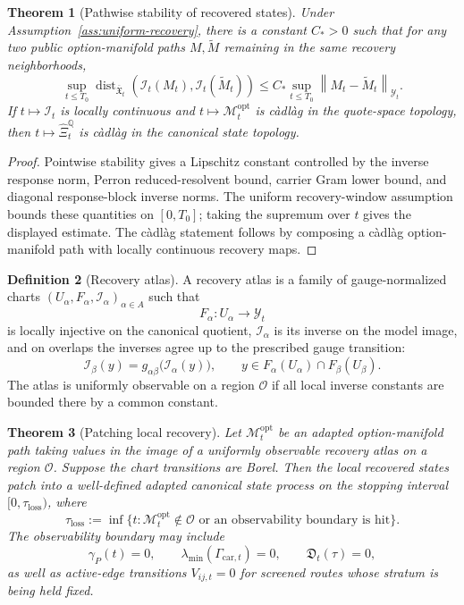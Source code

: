 \documentclass[11pt,a4paper]{amsart}
\theoremstyle{plain}
\newtheorem{theorem}{Theorem}[section]
\theoremstyle{definition}
\newtheorem{definition}[theorem]{Definition}
\theoremstyle{remark}
\DeclareMathOperator{\dist}{dist}
\newcommand{\QQ}{\mathbb{Q}}
\newcommand{\cM}{\mathcal{M}}
\newcommand{\cO}{\mathcal{O}}
\newcommand{\cY}{\mathcal{Y}}
\newcommand{\norm}[1]{\left\lVert #1\right\rVert}
\begin{document}
\begin{theorem}[Pathwise stability of recovered states]\label{thm:pathwise-stability}
Under Assumption~\ref{ass:uniform-recovery}, there is a constant \(C_*>0\) such that for any two
public option-manifold paths \(M,\widetilde M\) remaining in the same recovery neighborhoods,
\[
        \sup_{t\le T_0}
        \dist_{\overline{\mathfrak X}_t}
        \!\left(\mathcal I_t(M_t),\mathcal I_t(\widetilde M_t)\right)
        \le
        C_*
        \sup_{t\le T_0}\norm{M_t-\widetilde M_t}_{\cY_t}.
\]
If \(t\mapsto\mathcal I_t\) is locally continuous and \(t\mapsto\cM_t^{\mathrm{opt}}\) is
c\`adl\`ag in the quote-space topology, then \(t\mapsto\widehat\Xi_t^\QQ\) is c\`adl\`ag in
the canonical state topology.
\end{theorem}

\begin{proof}
Pointwise stability gives a Lipschitz constant controlled by the inverse response
norm, Perron reduced-resolvent bound, carrier Gram lower bound, and diagonal response-block inverse
norms.  The uniform recovery-window assumption bounds these quantities on \([0,T_0]\); taking the
supremum over \(t\) gives the displayed estimate.  The c\`adl\`ag statement follows by composing a
c\`adl\`ag option-manifold path with locally continuous recovery maps.
\end{proof}

\begin{definition}[Recovery atlas]\label{def:recovery-atlas}
A recovery atlas is a family of gauge-normalized charts
\((U_\alpha,F_\alpha,\mathcal I_\alpha)_{\alpha\in A}\) such that
\[
        F_\alpha:U_\alpha\to\cY_t
\]
is locally injective on the canonical quotient, \(\mathcal I_\alpha\) is its inverse on the
model image, and on overlaps the inverses agree up to the prescribed gauge transition:
\[
        \mathcal I_\beta(y)
        =
        g_{\alpha\beta}\bigl(\mathcal I_\alpha(y)\bigr),
        \qquad
        y\in F_\alpha(U_\alpha)\cap F_\beta(U_\beta).
\]
The atlas is uniformly observable on a region \(\cO\) if all local inverse constants are bounded
there by a common constant.
\end{definition}

\begin{theorem}[Patching local recovery]\label{thm:patching-local-recovery}
Let \(\cM_t^{\mathrm{opt}}\) be an adapted option-manifold path taking values in the image of a
uniformly observable recovery atlas on a region \(\cO\).  Suppose the chart transitions are
Borel.  Then the local recovered states patch into a well-defined adapted canonical state
process on the stopping interval \([0,\tau_{\mathrm{loss}})\), where
\[
        \tau_{\mathrm{loss}}
        :=
        \inf\{t:\cM_t^{\mathrm{opt}}\notin\cO
        \text{ or an observability boundary is hit}\}.
\]
The observability boundary may include
\[
        \gamma_P(t)=0,\qquad
        \lambda_{\min}(\Gamma_{\mathrm{car},t})=0,\qquad
        \mathfrak D_t(\tau)=0,
\]
as well as active-edge transitions \(V_{ij,t}=0\) for screened routes whose stratum is being
held fixed.
\end{theorem}
\end{document}
